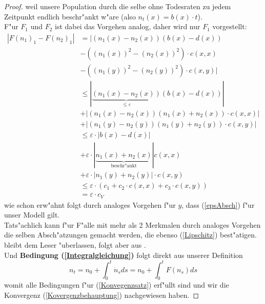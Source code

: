 \documentclass[11pt, a4paper, german]{article}
\theoremstyle{plain}
\newcommand{\eps}{\ensuremath{\varepsilon}}
\begin{document}
\begin{proof}
		weil unsere Population durch die selbe ohne Todesraten zu jedem Zeitpunkt endlich beschr"ankt w"are (also $ n_t(x) = b(x) \cdot t $).\\
		F"ur $ F_1 $ und $ F_2 $ ist dabei das Vorgehen analog, daher wird nur $ F_1 $ vorgestellt:\\
		\begin{align*}
			|F(n_1)_1 - F(n_2)_1| & = |(n_1(x) - n_2(x))(b(x) - d(x)) \\
			& - ((n_1(x))^2 - (n_2(x))^2) \cdot c(x,x)\\
			& - ((n_1(y))^2 - (n_2(y))^2) \cdot c(x,y) |\\
			& \le  |\underbrace{(n_1(x) - n_2(x))}_{ \le \eps}(b(x) - d(x)) |\\
			& + | (n_1(x) - n_2(x))(n_1(x) + n_2(x)) \cdot c(x,x) | \\
			& + | (n_1(y) - n_2(y))(n_1(y) + n_2(y)) \cdot c(x,y) |\\
			& \le \eps \cdot | b(x) - d(x) | \\
			& +  \eps \cdot |\underbrace{n_1(x) + n_2(x)}_{\text{beschr"ankt}}| c(x,x) \\
			& + \eps \cdot | n_1(y) + n_2(y) | \cdot c(x,y)\\
			& \le \eps \cdot ( c_1 + c_2 \cdot c(x,x) + c_3 \cdot c(x,y) )\\
			& = \eps \cdot c_V
		\end{align*}
		wie schon erw"ahnt folgt durch analoges Vorgehen f"ur $ y $, dass (\ref{epsAbsch}) f"ur unser Modell gilt.\\ 
		Tats"achlich kann f"ur F"alle mit mehr als 2 Merkmalen durch analoges Vorgehen die selben Absch"atzungen gemacht werden, die ebenso (\ref{Lipschitz}) best"atigen.\\
		
		\cite[Kapitel 11 - \textbf{(2.3)}]{ethier2009markov} bleibt dem Leser "uberlassen, folgt aber aus \cite[Kapitel 6 - (2.1)]{ethier2009markov}.\\
		Und \textbf{Bedingung (\ref{Integralgleichung})} folgt direkt aus unserer Definition
		\[ n_t = n_0 + \int_{0}^{t} \dot{n}_s ds = n_0 + \int_{0}^{t} F(n_s) ds \]
		womit alle Bedingungen f"ur (\ref{Konvegenzsatz}) erf"ullt sind und wir die Konvergenz (\ref{Kovergenzbehauptung}) nachgewiesen haben.
	\end{proof}
	
\end{document}
